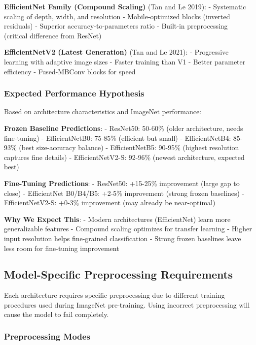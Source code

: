 \documentclass[
  letterpaper,
  DIV=11,
  numbers=noendperiod]{scrartcl}
\begin{document}
\textbf{EfficientNet Family (Compound Scaling)} (Tan and Le 2019): -
Systematic scaling of depth, width, and resolution - Mobile-optimized
blocks (inverted residuals) - Superior accuracy-to-parameters ratio -
Built-in preprocessing (critical difference from ResNet)

\textbf{EfficientNetV2 (Latest Generation)} (Tan and Le 2021): -
Progressive learning with adaptive image sizes - Faster training than V1
- Better parameter efficiency - Fused-MBConv blocks for speed

\subsubsection{Expected Performance
Hypothesis}\label{expected-performance-hypothesis}

Based on architecture characteristics and ImageNet performance:

\textbf{Frozen Baseline Predictions}: - ResNet50: 50-60\% (older
architecture, needs fine-tuning) - EfficientNetB0: 75-85\% (efficient
but small) - EfficientNetB4: 85-93\% (best size-accuracy balance) -
EfficientNetB5: 90-95\% (highest resolution captures fine details) -
EfficientNetV2-S: 92-96\% (newest architecture, expected best)

\textbf{Fine-Tuning Predictions}: - ResNet50: +15-25\% improvement
(large gap to close) - EfficientNet B0/B4/B5: +2-5\% improvement (strong
frozen baselines) - EfficientNetV2-S: +0-3\% improvement (may already be
near-optimal)

\textbf{Why We Expect This}: - Modern architectures (EfficientNet) learn
more generalizable features - Compound scaling optimizes for transfer
learning - Higher input resolution helps fine-grained classification -
Strong frozen baselines leave less room for fine-tuning improvement

\subsection{Model-Specific Preprocessing
Requirements}\label{model-specific-preprocessing-requirements}

Each architecture requires specific preprocessing due to different
training procedures used during ImageNet pre-training. Using incorrect
preprocessing will cause the model to fail completely.

\subsubsection{Preprocessing Modes}\label{preprocessing-modes}
\end{document}
